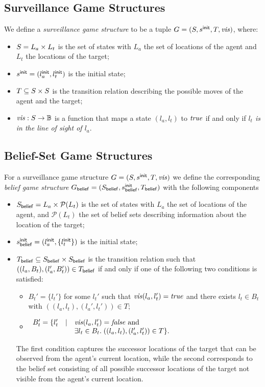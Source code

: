 \subsection{Surveillance Game Structures}
We define a \emph{surveillance game structure} to be  a tuple $G  = (S,s^{\mathsf{init}},T,\mathit{vis})$, where:
\begin{itemize}
\item $S = L_a \times L_t$ is the set of states with $L_a$ the set of locations of the agent and $L_t$ the locations of the target;
\item $s^{\mathsf{init}} = (l_a^{\mathsf{init}},l_t^{\mathsf{init}})$ is the initial state;
\item $T \subseteq S \times S$ is the transition relation describing the possible moves of the agent and the target;
\item $\mathit{vis} : S \to \mathbb{B}$ is a function that maps a state $(l_a,l_t)$ to $\mathit{true}$ if and only if\emph{ $l_t$ is in the line of sight of $l_a$}.
\end{itemize}

\begin{example}
\end{example}
\subsection{Belief-Set Game Structures}

For a surveillance game structure $G  = (S,s^{\mathsf{init}},T,\mathit{vis})$ we define the corresponding \emph{belief game structure} $G_{\mathsf{belief}}  = (S_{\mathsf{belief}},s^{\mathsf{init}}_{\mathsf{belief}},T_{\mathsf{belief}})$ with the following components
\begin{itemize}
\item $S_{\mathsf{belief}} = L_a \times \mathcal P(L_t)$ is the set of states with $L_a$ the set of locations of the agent, and $\mathcal P(L_t)$ the set of belief sets describing information about the location of the target;
\item $s^{\mathsf{init}}_{\mathsf{belief}} = (l_a^{\mathsf{init}},\{l_t^{\mathsf{init}}\})$ is the initial state;
\item $T_{\mathsf{belief}} \subseteq S_{\mathsf{belief}} \times S_{\mathsf{belief}}$ is the transition relation such that $((l_a, B_t),(l_a', B_t')) \in T_{\mathsf{belief}}$ if and only if one of the following two conditions is satisfied:
\begin{itemize}
\item $B_t' = \{l_t'\}$ for some $l_t'$ such that $\mathit{vis}(l_a,l_t') = \mathit{true}$ and
there exists $l_t \in B_t$ with $((l_a,l_t),(l_a',l_t')) \in T$;
\item $\begin{array}{lll}
B_t' = \{l_t' & \mid & \mathit{vis}(l_a,l_t') = \mathit{false} \text{ and }\\
&&\exists l_t \in B_t.\; ((l_a,l_t),(l_a',l_t')) \in T\}.
\end{array}
$
\end{itemize}
The first condition captures the successor locations of the target that can be observed from the agent's current location, while the second corresponds to the belief set consisting of all possible successor locations of the target not visible from the agent's current location.
\end{itemize}

